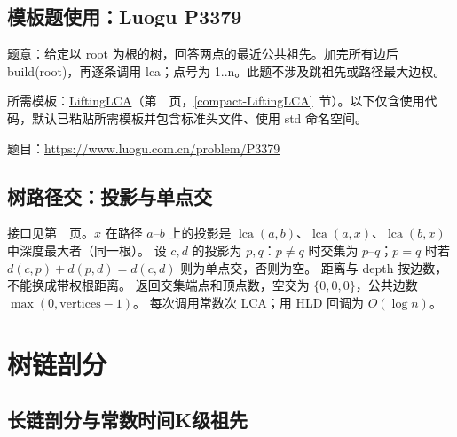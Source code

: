 \Needspace{400pt}



\newpage



\newpage



\Needspace{409pt}

\subsection*{模板题使用：Luogu P3379}

\label{usage-example-34}

题意：给定以 root 为根的树，回答两点的最近公共祖先。加完所有边后 build(root)，再逐条调用 lca；点号为 1..n。此题不涉及跳祖先或路径最大边权。

所需模板：\hyperref[compact-LiftingLCA]{LiftingLCA}（第~\pageref{compact-LiftingLCA}~页，\ref{compact-LiftingLCA}~节）。以下仅含使用代码，默认已粘贴所需模板并包含标准头文件、使用 std 命名空间。

题目：\url{https://www.luogu.com.cn/problem/P3379}



\subsection{树路径交：投影与单点交}\label{knowledge-path-intersection}
接口见第~\pageref{compact-path_intersection}~页。$x$ 在路径 $a$--$b$ 上的投影是
$\operatorname{lca}(a,b)$、$\operatorname{lca}(a,x)$、$\operatorname{lca}(b,x)$ 中深度最大者（同一根）。
设 $c,d$ 的投影为 $p,q$：$p\ne q$ 时交集为 $p$--$q$；$p=q$ 时若 $d(c,p)+d(p,d)=d(c,d)$ 则为单点交，否则为空。
距离与 depth 按边数，不能换成带权根距离。
返回交集端点和顶点数，空交为 $\{0,0,0\}$，公共边数 $\max(0,\mathrm{vertices}-1)$。
每次调用常数次 LCA；用 HLD 回调为 $O(\log n)$。



\Needspace{180pt}

\section{树链剖分}

\subsection{长链剖分与常数时间K级祖先}\label{compact-LongChain}

